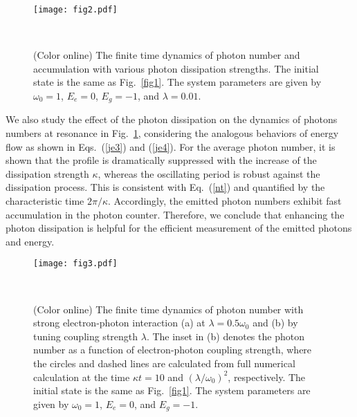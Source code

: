 \documentclass[twocolumn,showpacs,preprintnumbers,amsmath,amssymb]{revtex4}
\begin{document}
	\begin{figure}[tbp]
		\begin{center}
			\texttt{[image: fig2.pdf]}
			\caption{(Color online) The finite time dynamics of photon number and accumulation
				with various photon dissipation strengths.
				The initial state is the same as Fig.~\ref{fig1}.
				The system parameters are given by $\omega_0=1$,
				$E_e=0$,
				$E_g=-1$,
				and $\lambda=0.01$.
			}~\label{fig2}
		\end{center}
	\end{figure}
	
	
	We also study the effect of the photon dissipation on the dynamics of photons numbers at resonance in Fig.~\ref{fig2},
	considering the analogous behaviors of energy flow as shown in Eqs.~(\ref{je3})
	and (\ref{je4}).
	For the average photon number, it is shown that the profile is dramatically suppressed with the increase of the dissipation strength $\kappa$,
	whereas the oscillating period is robust against the dissipation process.
	This is consistent with Eq.~(\ref{nt}) and quantified by the characteristic time $2\pi/\kappa$.
	Accordingly, the emitted photon numbers exhibit fast accumulation in the photon counter.
	Therefore, we conclude that enhancing the photon dissipation is helpful for the efficient measurement of the emitted photons and energy.
	
	
	
	
	
	

	
	\begin{figure}[tbp]
		\begin{center}
			\texttt{[image: fig3.pdf]}
			\caption{(Color online) The finite time dynamics of photon number with strong electron-photon interaction
				(a) at $\lambda=0.5\omega_0$
				and
				(b) by tuning coupling strength $\lambda$.
				The inset in (b) denotes the photon number as a function of electron-photon coupling strength,
				where the circles and dashed lines are calculated from full numerical calculation at the time ${\kappa}t=10$ and $(\lambda/\omega_0)^2$, respectively.
				The initial state is the same as Fig.~\ref{fig1}.
				The system parameters are given by $\omega_0=1$,
				$E_e=0$,
				and
				$E_g=-1$.
			}~\label{fig3}
		\end{center}
	\end{figure}
	
\end{document}
